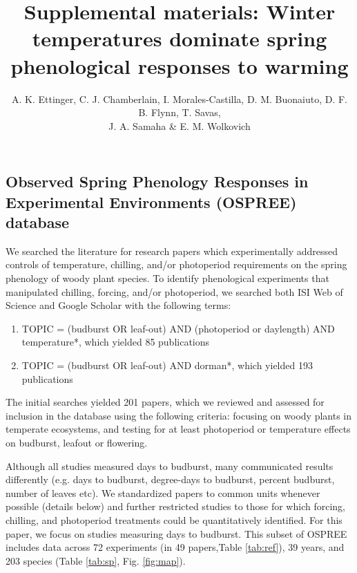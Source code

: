 \documentclass{article}
\begin{document}

\title{Supplemental materials:  Winter temperatures dominate spring phenological responses to warming} 

\author{A. K. Ettinger, C. J. Chamberlain, I. Morales-Castilla, D. M. Buonaiuto, D. F. B. Flynn, T. Savas, \\J. A. Samaha \& E. M. Wolkovich}
\maketitle  %
\renewcommand{\thetable}{S\arabic{table}}
\renewcommand{\thefigure}{S\arabic{figure}}

\subsection*{Observed Spring Phenology Responses in Experimental Environments (OSPREE) database}
\par We searched the literature for research papers which experimentally addressed controls of temperature, chilling, and/or photoperiod requirements on the spring phenology of woody plant species. To identify phenological experiments that manipulated chilling, forcing, and/or photoperiod, we searched both ISI Web of Science and Google Scholar with the following terms: 
\begin{enumerate}
\item TOPIC = (budburst OR leaf-out) AND (photoperiod or daylength) AND temperature*, which yielded 85 publications

\item TOPIC = (budburst OR leaf-out) AND dorman*, which yielded 193 publications
\end{enumerate}



The initial searches yielded 201 papers, which we reviewed and assessed for inclusion in the database using the following criteria: focusing on woody plants in temperate ecosystems, and testing for at least photoperiod or temperature effects on budburst, leafout or 
flowering. 
\par Although all studies measured days to budburst, many communicated results differently (e.g. days to budburst, degree-days to budburst, percent budburst, number of leaves etc). We standardized papers to common units whenever possible (details below) and further restricted studies to those for which forcing, chilling, and photoperiod treatments could be quantitatively identified. For this paper, we focus on studies measuring days to budburst. This subset of OSPREE includes data across 72 experiments (in 49 papers,Table \ref{tab:ref}), 39 years, and 203 species (Table \ref{tab:sp}, Fig. \ref{fig:map}).
\end{document}
